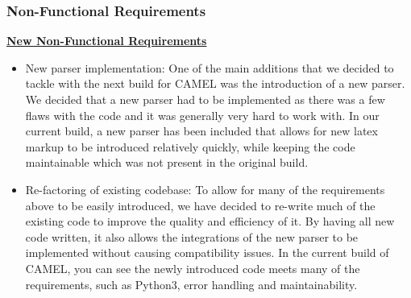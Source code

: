 	\subsubsection{Non-Functional Requirements}
	\underline{\textbf{New Non-Functional Requirements}}
	\begin{itemize}
		
		\item New parser implementation: One of the main additions that we decided to tackle with the next build for CAMEL was the introduction of a new parser. We decided that a new parser had to be implemented as there was a few flaws with the code and it was generally very hard to work with. In our current build, a new parser has been included that allows for new latex markup to be introduced relatively quickly, while keeping the code maintainable which was not present in the original build.    
		
		\item Re-factoring of existing codebase: To allow for many of the requirements above to be easily introduced, we have decided to re-write much of the existing code to improve the quality and efficiency of it. By having all new code written, it also allows the integrations of the new parser to be implemented without causing compatibility issues. In the current build of CAMEL, you can see the newly introduced code meets many of the requirements, such as Python3, error handling and maintainability. 
	\end{itemize}
	
